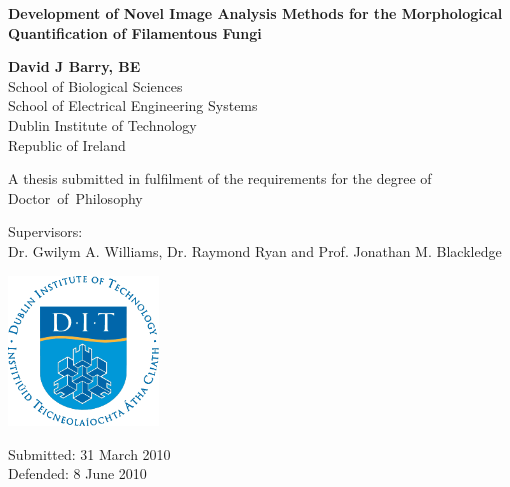 \oddsidemargin=13.5pt
\hoffset=0pt

\thispagestyle{empty}

\begin{centering}

{\bfseries\LARGE Development of Novel Image Analysis Methods for the Morphological Quantification of Filamentous Fungi}

\vspace*{\fill}

{\bfseries\Large David J Barry, BE}\\
School of Biological Sciences\\
School of Electrical Engineering Systems\\
Dublin Institute of Technology\\
Republic of Ireland

\vspace*{\fill}

A thesis submitted in fulfilment of the requirements for the degree of Doctor~of~Philosophy

\vspace*{\fill}

Supervisors:
\\
Dr. Gwilym A. Williams, Dr. Raymond Ryan and Prof. Jonathan M. Blackledge

\vspace*{\fill}

\includegraphics[width=4cm]{DITlogo}

\vspace{0.5cm}

Submitted: 31 March 2010\\
Defended: 8 June 2010

\end{centering}